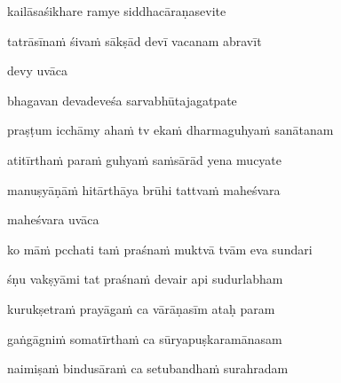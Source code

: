 kailāsaśikhare ramye siddhacāraṇasevite\thinspace{\danda} \dontdisplaylinenum

tatrāsīnaṁ śivaṁ sākṣād devī vacanam abravīt \veg\dontdisplaylinenum
{}

devy uvāca~{\dandab}\dontdisplaylinenum 

bhagavan devadeveśa sarvabhūtajagatpate\thinspace{\danda} \dontdisplaylinenum

praṣṭum icchāmy ahaṁ tv ekaṁ dharmaguhyaṁ sanātanam \veg\dontdisplaylinenum
{}

atitīrthaṁ paraṁ guhyaṁ saṁsārād yena mucyate\thinspace{\dandab} \dontdisplaylinenum

manuṣyāṇāṁ hitārthāya brūhi tattvaṁ maheśvara \veg\dontdisplaylinenum
{}

maheśvara uvāca~{\dandab}\dontdisplaylinenum 

ko māṁ pcchati taṁ praśnaṁ muktvā tvām eva sundari\thinspace{\danda} \dontdisplaylinenum

śṇu vakṣyāmi tat praśnaṁ devair api sudurlabham \veg\dontdisplaylinenum
{}

kurukṣetraṁ prayāgaṁ ca vārāṇasīm ataḥ param\thinspace{\dandab} \dontdisplaylinenum

gaṅgāgniṁ somatīrthaṁ ca sūryapuṣkaramānasam \veg\dontdisplaylinenum
{}

naimiṣaṁ bindusāraṁ ca setubandhaṁ surahradam\thinspace{\dandab} \dontdisplaylinenum

